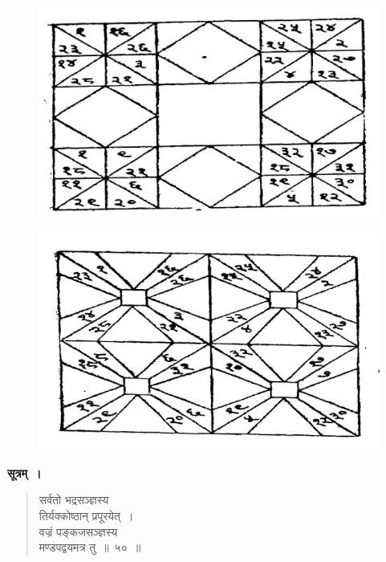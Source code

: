 \documentclass[11pt, openany]{book}
\begin{document}
\begin{figure}[h!]
    \centering
    \includegraphics[scale=0.3]{graphics/414_2.jpg}
    
\end{figure}

\begin{figure}[h!]
    \centering
    \includegraphics[scale=0.3]{graphics/414_3.jpg}
    
\end{figure}

\newpage

\textbf{सूत्रम्~।}

\begin{quote}
{\gk सर्वतो भद्रसञ्ज्ञस्य\\
तिर्यक्कोष्ठान् प्रपूरयेत्~।\\
वज्रं पङ्कजसञ्ज्ञस्य\\
मण्डपद्वयमत्र तु~॥~५०~॥	}
\end{quote}
\end{document}
